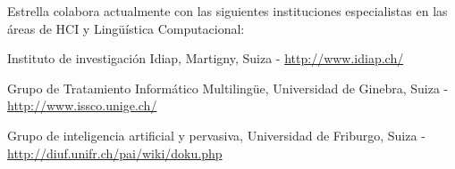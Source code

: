 Estrella colabora actualmente con las siguientes instituciones especialistas en las \'areas de HCI y  Ling\"u\'istica Computacional:
\begin{myitemize}
    \item  Instituto de investigaci\'on Idiap, Martigny, Suiza -  \url{http://www.idiap.ch/}
\item Grupo de Tratamiento Inform\'atico Multiling\"ue, Universidad de Ginebra, Suiza - \url{http://www.issco.unige.ch/}
\item Grupo de inteligencia artificial y pervasiva, Universidad de Friburgo, Suiza - \url{http://diuf.unifr.ch/pai/wiki/doku.php}
\end{myitemize}


